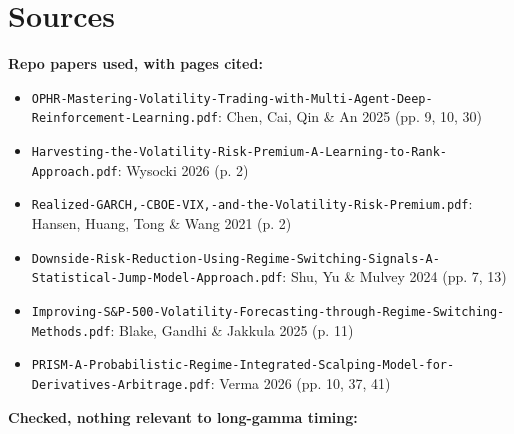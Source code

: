 \documentclass{article}
\begin{document}
\section{Sources}

\textbf{Repo papers used, with pages cited:}

\begin{itemize}

\item \texttt{OPHR-\allowbreak{}Mastering-\allowbreak{}Volatility-\allowbreak{}Trading-\allowbreak{}with-\allowbreak{}Multi-\allowbreak{}Agent-\allowbreak{}Deep-\allowbreak{}Reinforcement-\allowbreak{}Learning.\allowbreak{}pdf}: Chen, Cai, Qin \& An 2025 (pp. 9, 10, 30)

\item \texttt{Harvesting-\allowbreak{}the-\allowbreak{}Volatility-\allowbreak{}Risk-\allowbreak{}Premium-\allowbreak{}A-\allowbreak{}Learning-\allowbreak{}to-\allowbreak{}Rank-\allowbreak{}Approach.\allowbreak{}pdf}: Wysocki 2026 (p. 2)

\item \texttt{Realized-\allowbreak{}GARCH,\allowbreak{}-\allowbreak{}CBOE-\allowbreak{}VIX,\allowbreak{}-\allowbreak{}and-\allowbreak{}the-\allowbreak{}Volatility-\allowbreak{}Risk-\allowbreak{}Premium.\allowbreak{}pdf}: Hansen, Huang, Tong \& Wang 2021 (p. 2)

\item \texttt{Downside-\allowbreak{}Risk-\allowbreak{}Reduction-\allowbreak{}Using-\allowbreak{}Regime-\allowbreak{}Switching-\allowbreak{}Signals-\allowbreak{}A-\allowbreak{}Statistical-\allowbreak{}Jump-\allowbreak{}Model-\allowbreak{}Approach.\allowbreak{}pdf}: Shu, Yu \& Mulvey 2024 (pp. 7, 13)

\item \texttt{Improving-\allowbreak{}S\&P-\allowbreak{}500-\allowbreak{}Volatility-\allowbreak{}Forecasting-\allowbreak{}through-\allowbreak{}Regime-\allowbreak{}Switching-\allowbreak{}Methods.\allowbreak{}pdf}: Blake, Gandhi \& Jakkula 2025 (p. 11)

\item \texttt{PRISM-\allowbreak{}A-\allowbreak{}Probabilistic-\allowbreak{}Regime-\allowbreak{}Integrated-\allowbreak{}Scalping-\allowbreak{}Model-\allowbreak{}for-\allowbreak{}Derivatives-\allowbreak{}Arbitrage.\allowbreak{}pdf}: Verma 2026 (pp. 10, 37, 41)

\end{itemize}

\textbf{Checked, nothing relevant to long-gamma timing:}
\end{document}
